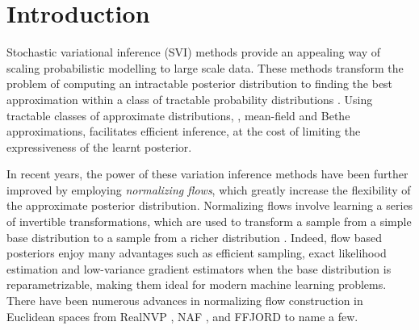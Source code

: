 \section{Introduction}
Stochastic variational inference (SVI) methods provide an appealing way of scaling probabilistic modelling to large scale data.
These methods transform the problem of computing an intractable posterior distribution to finding the best approximation within a class of tractable probability distributions \cite{hoffman2013stochastic}.
Using tractable classes of approximate distributions, \eg, mean-field and Bethe approximations, facilitates efficient inference, at the cost of limiting the expressiveness of the learnt posterior. 

In recent years, the power of these variation inference methods have been further improved by employing {\em normalizing flows}, which greatly increase the flexibility of the approximate posterior distribution. 
Normalizing flows involve learning a series of invertible transformations, which are used to transform a sample from a simple base distribution to a sample from a richer distribution \cite{rezende2015variational}. 
Indeed, flow based posteriors enjoy many advantages such as efficient sampling, exact likelihood estimation and low-variance gradient estimators when the base distribution is reparametrizable, making them ideal for modern machine learning problems.
There have been numerous advances in normalizing flow construction in Euclidean spaces from RealNVP \cite{dinh2016density}, NAF \cite{huang2018neural}, and FFJORD \cite{grathwohl2018ffjord} to name a few.

